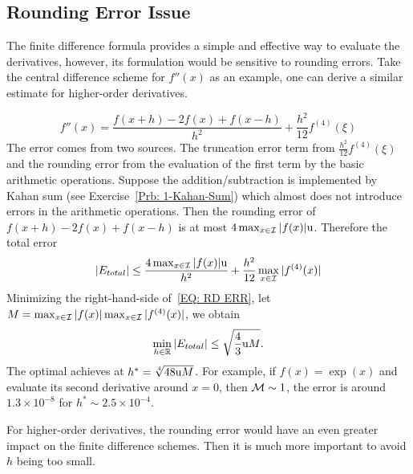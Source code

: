 \subsection{Rounding Error Issue}
\label{SSec: 3-Rou-Err-Iss}
The finite difference formula provides a simple and effective way to evaluate the derivatives, however, its formulation would be sensitive to rounding errors. Take the central difference scheme for $f''(x)$ as an example, one can derive a similar estimate for higher-order derivatives.
\begin{example}
    \begin{equation}
        f''(x) = \frac{f(x + h) - 2 f(x) + f(x - h)}{h^2} + \frac{h^2}{12}f^{(4)} (\xi)
    \end{equation}
    The error comes from two sources. The truncation error term from $\frac{h^2}{12} f^{(4)}(\xi)$ and the rounding error from the evaluation of the first term by the basic arithmetic operations.  Suppose the addition/subtraction is implemented by Kahan sum (see Exercise~\ref{Prb: 1-Kahan-Sum}) which almost does not introduce errors in the arithmetic operations. Then the rounding error of $f(x + h) - 2 f(x) + f(x - h)$ is at most $4 \max_{x\in \mathcal I} |f(x) | \textup{u}$.  Therefore the total error
    \begin{equation}\label{EQ: RD ERR}
        |E_{total}|\le \frac{4 \max_{x\in \mathcal I} |f(x) | \textup{u}}{h^2} + \frac{h^2}{12} \max_{x\in \mathcal I} |f^{(4)} (x)|
    \end{equation}
    Minimizing the right-hand-side of~\eqref{EQ: RD ERR}, let $M = \max_{x\in\mathcal I} |f(x)| \max_{x\in\mathcal I} |f^{(4)}(x)|$, we obtain 
    $$\min_{h\in\mathbb R} |E_{total}| \le \sqrt{\frac{4}{3}\textup{u} M }.$$
    The optimal achieves at $h^{\ast} = \sqrt[4]{48\textup{u}M}$. For example, if $f(x) = \exp(x)$ and evaluate its second derivative around $x = 0$, then $\mathcal M\sim 1$, the error is around $1.3\times 10^{-8}$ for $h^{\ast}\sim 2.5\times 10^{-4}$. 
\end{example}
For higher-order derivatives, the rounding error would have an even greater impact on the finite difference schemes. Then it is much more important to avoid $h$ being too small. 

